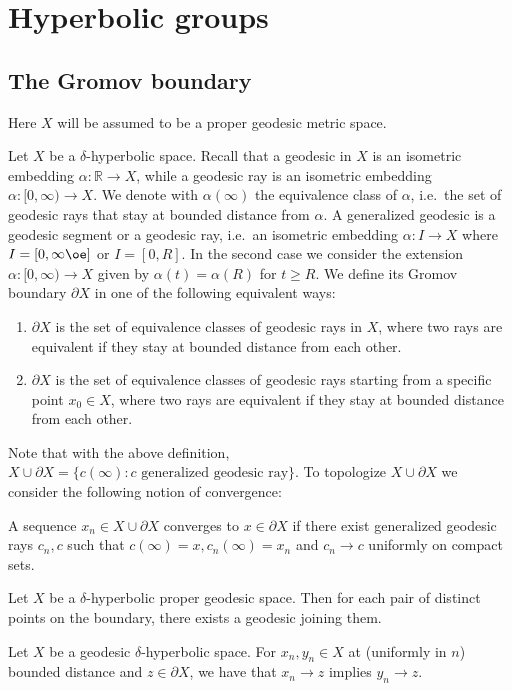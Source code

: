 \documentclass{report}
\begin{document}
\section{Hyperbolic groups}
\subsection{The Gromov boundary}
Here $X$ will be assumed to be a proper geodesic metric space.
\begin{definition}
    Let $X$ be a $\delta$-hyperbolic space.
    Recall that a geodesic in $X$ is an isometric embedding $\alpha: \mathbb R \to X$, while a geodesic ray is an isometric embedding $\alpha: [0, \infty) \to X$.
    We denote with $\alpha(\infty)$ the equivalence class of $\alpha$, i.e.\ the set of geodesic rays that stay at bounded distance from $\alpha$.
    A generalized geodesic is a geodesic segment or a geodesic ray, i.e.\ an isometric embedding $\alpha: I \to X$ where $I=[0, \inftyœ]$ or $I = [0, R]$.
    In the second case we consider the extension $\alpha: [0, \infty) \to X$ given by $\alpha(t) = \alpha(R)$ for $t \geq R$.
    We define its Gromov boundary $\partial X$ in one of the following equivalent ways:
    \begin{enumerate}[label=(\roman*)]
        \item $\partial X$ is the set of equivalence classes of geodesic rays in $X$, where two rays are equivalent if they stay at bounded distance from each other.
        \item $\partial X$ is the set of equivalence classes of geodesic rays starting from a specific point $x_0 \in X$, where two rays are equivalent if they stay at bounded distance from each other.
    \end{enumerate}
\end{definition}
Note that with the above definition, $X \cup \partial X  = \{c(\infty) : c \text{ generalized geodesic ray} \}$.
To topologize $X \cup \partial X$ we consider the following notion of convergence:
\begin{definition}
    A sequence $x_n \in X \cup \partial X$ converges to $x \in \partial X$ if there exist generalized geodesic rays $c_n, c$ such that $c(\infty) = x, c_n(\infty) = x_n$ and $c_n \to c$ uniformly on compact sets.
\end{definition}
\begin{proposition}
    Let $X$ be a $\delta$-hyperbolic proper geodesic space.
    Then for each pair of distinct points on the boundary, there exists a geodesic joining them.
\end{proposition}
\begin{lemma}\label{lem:bounded_distance_convergence}
    Let $X$ be a geodesic $\delta$-hyperbolic space.
    For $x_n, y_n \in X$ at (uniformly in $n$) bounded distance and $z \in \partial X$, we have that $x_n \to z$ implies $y_n \to z$.
\end{lemma}
\end{document}

